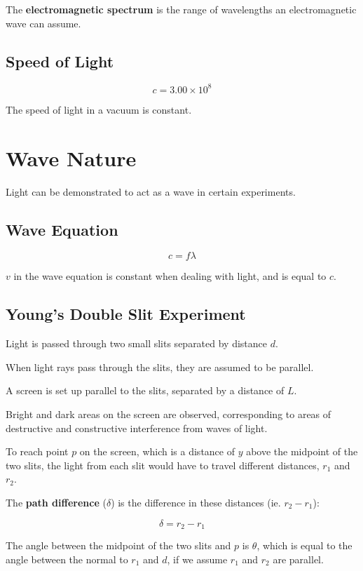 \documentclass[a4paper,11pt]{report}
\begin{document}
The \textbf{electromagnetic spectrum} is the range of wavelengths an
electromagnetic wave can assume.

\subsection{Speed of Light}

$$
c = 3.00 \times 10^8
$$

The speed of light in a vacuum is constant.


\section{Wave Nature}

Light can be demonstrated to act as a wave in certain experiments.

\subsection{Wave Equation}

$$
c = f \lambda
$$

$v$ in the wave equation is constant when dealing with light, and is equal to
$c$.

\subsection{Young's Double Slit Experiment}


Light is passed through two small slits separated by distance $d$.

When light rays pass through the slits, they are assumed to be parallel.

A screen is set up parallel to the slits, separated by a distance of $L$.

Bright and dark areas on the screen are observed, corresponding to areas of
destructive and constructive interference from waves of light.

To reach point $p$ on the screen, which is a distance of $y$ above the midpoint
of the two slits, the light from each slit would have to travel different
distances, $r_1$ and $r_2$.

The \textbf{path difference} ($\delta$) is the difference in these distances
(ie. $r_2 - r_1$):

$$
\delta = r_2 - r_1
$$

The angle between the midpoint of the two slits and $p$ is $\theta$, which is
equal to the angle between the normal to $r_1$ and $d$, if we assume $r_1$ and
$r_2$ are parallel.
\end{document}
